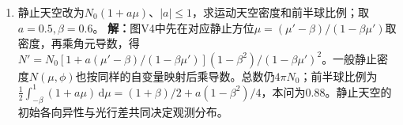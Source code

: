 \documentclass[UTF8,fontset=fandol,a4paper,11pt]{ctexart}
\begin{document}
\begin{enumerate}
\item 静止天空改为$N_0(1+a\mu)$、$|a|\le1$，求运动天空密度和前半球比例；取$a=0.5,\beta=0.6$。
\textbf{解：}图V4中先在对应静止方位$\mu=(\mu'-\beta)/(1-\beta\mu')$取密度，再乘角元导数，得$N'=N_0[1+a(\mu'-\beta)/(1-\beta\mu')](1-\beta^2)/(1-\beta\mu')^2$。一般静止密度$N(\mu,\phi)$也按同样的自变量映射后乘导数。总数仍$4\pi N_0$；前半球比例为$\tfrac12\int_{-\beta}^1(1+a\mu)\,\mathrm d\mu=(1+\beta)/2+a(1-\beta^2)/4$，本问为0.88。静止天空的初始各向异性与光行差共同决定观测分布。
\begin{center}\begin{minipage}{.98\linewidth}\centering
{}
\end{minipage}
\end{center}
\end{enumerate}
\end{document}
